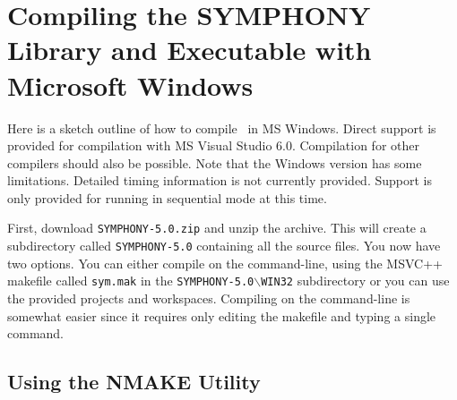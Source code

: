 
\section{Compiling the SYMPHONY Library and Executable with Microsoft Windows}
\label{getting_started_windows}

Here is a sketch outline of how to compile \BB\ in MS Windows. Direct
support is provided for compilation with MS Visual Studio 6.0. Compilation for
other compilers should also be possible. Note that the Windows version has
some limitations. Detailed timing information is not currently provided.
Support is only provided for running in sequential mode at this time.

First, download \texttt{SYMPHONY-5.0.zip} and unzip the archive. This will
create a subdirectory called \texttt{SYMPHONY-5.0} containing all
the source files. You now have two options. You can either compile on the
command-line, using the MSVC++ makefile called
\texttt{sym.mak} in the \texttt{SYMPHONY-5.0$\backslash$WIN32} subdirectory or 
you can use the provided projects and workspaces. Compiling on the command-line 
is somewhat easier since it requires only editing the makefile and typing a
single command.

\subsection{Using the NMAKE Utility}
\label{using_nmake}

